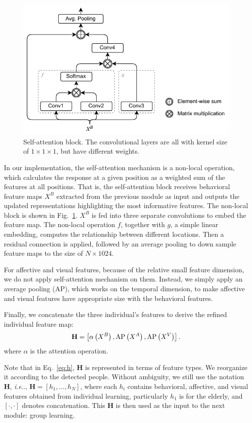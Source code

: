 \documentclass[VANCOUVER,STIX1COL]{WileyNJD-v2}
\makeatletter
\DeclareRobustCommand\onedot{\futurelet\@let@token\@onedot}
\def\@onedot{\ifx\@let@token.\else.\null\fi\xspace}
\def\ie{\emph{i.e}\onedot}
\makeatother
\begin{document}
\begin{figure}[b]
  \centering
  \includegraphics[width=0.65\linewidth]{assets/self-attention}
  \caption{Self-attention block. The convolutional layers are all with kernel size of $1\times1\times1$, but have different weights.}
  \label{f:self-attention}
\end{figure}

In our implementation, the self-attention mechanism is a non-local operation, which calculates the response at a given position as a weighted sum of the features at all positions. That is, the self-attention block receives behavioral feature maps $X^B$ extracted from the previous module as input and outputs the updated representations highlighting the most informative features. The non-local block is shown in Fig.~\ref{f:self-attention}. $X^B$ is fed into three separate convolutions to embed the feature map. The non-local operation $f$, together with $g$, a simple linear embedding, computes the relationship between different locations. Then a residual connection is applied, followed by an average pooling to down sample feature maps to the size of $N\times1024$.

For affective and visual features, because of the relative small feature dimension, we do not apply self-attention mechanism on them. Instead, we simply apply an average pooling (AP), which works on the temporal dimension, to make affective and visual features have appropriate size with the behavioral features.

Finally, we concatenate the three individual's features to derive the refined individual feature map:
\begin{equation}
\label{eq:h}
  \mathbf{H} = \left[\alpha\left(X^B\right), {\rm AP}\left(X^A\right), {\rm AP}\left(X^V\right)\right].
\end{equation}
where $\alpha$ is the attention operation.

Note that in Eq.~\ref{eq:h}, $\mathbf{H}$ is represented in terms of feature types. We reorganize it according to the detected people. Without ambiguity, we still use the notation $\mathbf{H}$, \ie, $\mathbf{H} = \left[h_1, ..., h_N\right]$, where each $h_i$ contains behavioral, affective, and visual features obtained from individual learning, particularly $h_1$ is for the elderly, and $\left[\cdot, \cdot\right]$ denotes concatenation. This $\mathbf{H}$ is then used as the input to the next module: group learning.
\end{document}
